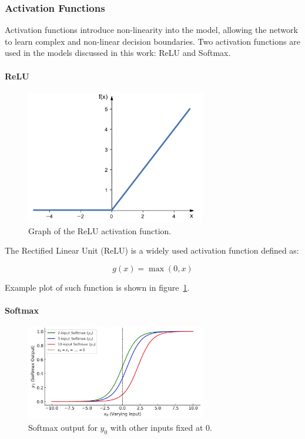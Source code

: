 \documentclass{pracalicmgr}
\begin{document}
\subsubsection{Activation Functions}

Activation functions introduce non-linearity into the model, allowing the network to learn complex and non-linear decision boundaries. Two activation functions are used in the models discussed in this work: ReLU and Softmax.

\paragraph{ReLU}

\begin{figure}[H]
\centering
\includegraphics[width=0.7\textwidth]{src/relu.png}
\caption{Graph of the ReLU activation function.}
\label{fig:relu}
\end{figure}

The Rectified Linear Unit (ReLU) is a widely used activation function defined as:

\[
g(x) = \max(0, x)
\]

Example plot of such function is shown in figure~\ref{fig:relu}.

\paragraph{Softmax}

\begin{figure}[H]
\centering
\includegraphics[width=0.7\textwidth]{src/softmax.pdf}
\caption{Softmax output for $y_0$ with other inputs fixed at 0.}
\label{fig:softmax}
\end{figure}
\end{document}
